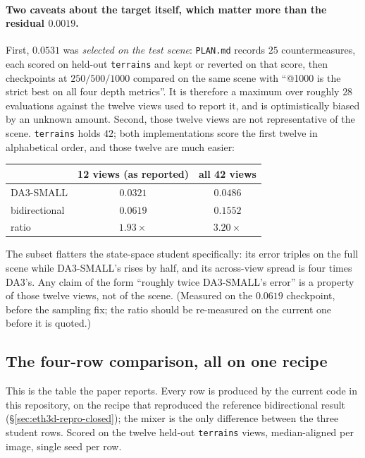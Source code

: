 \documentclass[11pt,a4paper]{article}
\begin{document}
\paragraph{Two caveats about the target itself, which matter more than the residual $0.0019$.}
First, $0.0531$ was \emph{selected on the test scene}: \texttt{PLAN.md} records $25$
countermeasures, each scored on held-out \texttt{terrains} and kept or reverted on that score,
then checkpoints at $250/500/1000$ compared on the same scene with ``@1000 is the strict best on
all four depth metrics''. It is therefore a maximum over roughly $28$ evaluations against the
twelve views used to report it, and is optimistically biased by an unknown amount. Second, those
twelve views are not representative of the scene. \texttt{terrains} holds $42$; both
implementations score the first twelve in alphabetical order, and those twelve are much easier:

\begin{center}
\begin{tabular}{lcc}
\toprule
 & 12 views (as reported) & all 42 views \\
\midrule
DA3-SMALL      & $0.0321$ & $0.0486$ \\
bidirectional  & $0.0619$ & $0.1552$ \\
ratio          & $1.93\times$ & $\mathbf{3.20\times}$ \\
\bottomrule
\end{tabular}
\end{center}

\noindent The subset flatters the state-space student specifically: its error triples on the full
scene while DA3-SMALL's rises by half, and its across-view spread is four times DA3's. Any claim
of the form ``roughly twice DA3-SMALL's error'' is a property of those twelve views, not of the
scene. (Measured on the $0.0619$ checkpoint, before the sampling fix; the ratio should be
re-measured on the current one before it is quoted.)

\subsection{The four-row comparison, all on one recipe}
\label{sec:eth3d-final-table}

This is the table the paper reports. Every row is produced by the current code in this
repository, on the recipe that reproduced the reference bidirectional result
(\S\ref{sec:eth3d-repro-closed}); the mixer is the only difference between the three student
rows. Scored on the twelve held-out \texttt{terrains} views, median-aligned per image, single
seed per row.
\end{document}
